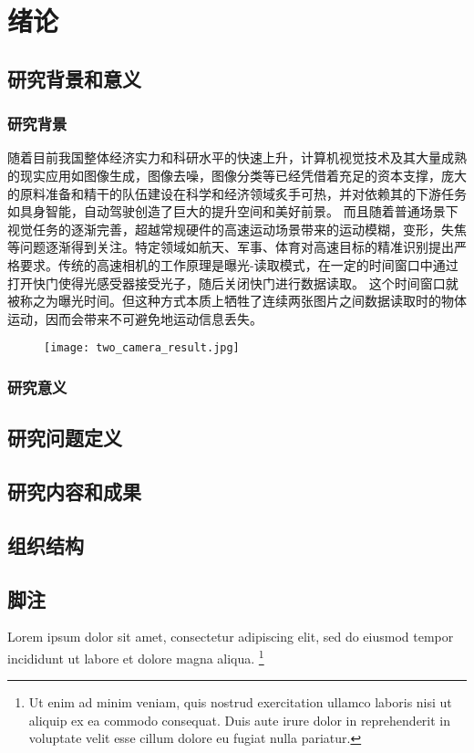 
\chapter{绪论}

\section{研究背景和意义}

\subsection{研究背景}
随着目前我国整体经济实力和科研水平的快速上升，计算机视觉技术及其大量成熟的现实应用如图像生成，图像去噪，图像分类等已经凭借着充足的资本支撑，庞大的原料准备和精干的队伍建设在科学和经济领域炙手可热，并对依赖其的下游任务如具身智能，自动驾驶创造了巨大的提升空间和美好前景。
而且随着普通场景下视觉任务的逐渐完善，超越常规硬件的高速运动场景带来的运动模糊，变形，失焦等问题逐渐得到关注。特定领域如航天、军事、体育对高速目标的精准识别提出严格要求。传统的高速相机的工作原理是曝光-读取模式，在一定的时间窗口中通过打开快门使得光感受器接受光子，随后关闭快门进行数据读取。
这个时间窗口就被称之为曝光时间。但这种方式本质上牺牲了连续两张图片之间数据读取时的物体运动，因而会带来不可避免地运动信息丢失。

\begin{figure}[ht]
  \centering
  \texttt{[image: two\_camera\_result.jpg]}
  \label{fig:two_camera_result}
\end{figure}    
\subsection{研究意义}



\section{研究问题定义}

\section{研究内容和成果}

\section{组织结构}



\section{脚注}

Lorem ipsum dolor sit amet, consectetur adipiscing elit, sed do eiusmod tempor
incididunt ut labore et dolore magna aliqua.
\footnote{Ut enim ad minim veniam, quis nostrud exercitation ullamco laboris
  nisi ut aliquip ex ea commodo consequat.
  Duis aute irure dolor in reprehenderit in voluptate velit esse cillum dolore
  eu fugiat nulla pariatur.}
